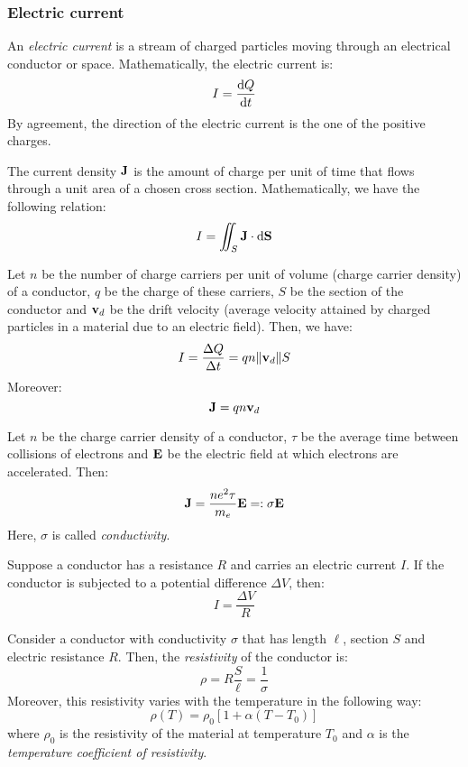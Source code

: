\documentclass[../../../main.tex]{subfiles}
\begin{document}
\begin{multicols}{2}
  \subsubsection{Electric current}
  \begin{definition}
    An \emph{electric current} is a stream of charged particles moving through an electrical conductor or space. Mathematically, the electric current is: $$I=\dv{Q}{t}$$
    By agreement, the direction of the electric current is the one of the positive charges.
  \end{definition}
  \begin{definition}
    The current density $\boldsymbol{\mathrm{J}}$ is the amount of charge per unit of time that flows through a unit area of a chosen cross section. Mathematically, we have the following relation: $$I=\iint_S\boldsymbol{\mathrm{J}}\cdot\dd{\boldsymbol{\mathrm{S}}}$$
  \end{definition}
  \begin{proposition}
    Let $n$ be the number of charge carriers per unit of volume (charge carrier density) of a conductor, $q$ be the charge of these carriers, $S$ be the section of the conductor and $\boldsymbol{\mathrm{v}}_d$ be the drift velocity (average velocity attained by charged particles in a material due to an electric field). Then, we have:
    $$I=\frac{\Delta Q}{\Delta t}=q n \|\boldsymbol{\mathrm{v}}_d\|S$$
    Moreover: $$\boldsymbol{\mathrm{J}}=q n\boldsymbol{\mathrm{v}}_d$$
  \end{proposition}
  \begin{law}
    Let $n$ be the charge carrier density of a conductor, $\tau$ be the average time between collisions of electrons and $\boldsymbol{\mathrm{E}}$ be the electric field at which electrons are accelerated. Then: $$\boldsymbol{\mathrm{J}}=\frac{ne^2\tau}{m_e}\boldsymbol{\mathrm{E}}=:\sigma\boldsymbol{\mathrm{E}}$$
    Here, $\sigma$ is called \emph{conductivity}.
  \end{law}
  \begin{law}
    Suppose a conductor has a resistance $R$ and carries an electric current $I$. If the conductor is subjected to a potential difference $\Delta V$, then: $$I=\frac{\Delta V}{R}$$
  \end{law}
  \begin{definition}[Resistivity]
    Consider a conductor with conductivity $\sigma$ that has length $\ell$, section $S$ and electric resistance $R$. Then, the \emph{resistivity} of the conductor is: $$\rho=R\frac{S}{\ell}=\frac{1}{\sigma}$$
    Moreover, this resistivity varies with the temperature in the following way: $$\rho(T)=\rho_0\left[1+\alpha(T-T_0)\right]$$
    where $\rho_0$ is the resistivity of the material at temperature $T_0$ and $\alpha$ is the \emph{temperature coefficient of resistivity}.

\end{definition}
\end{multicols}
\end{document}
